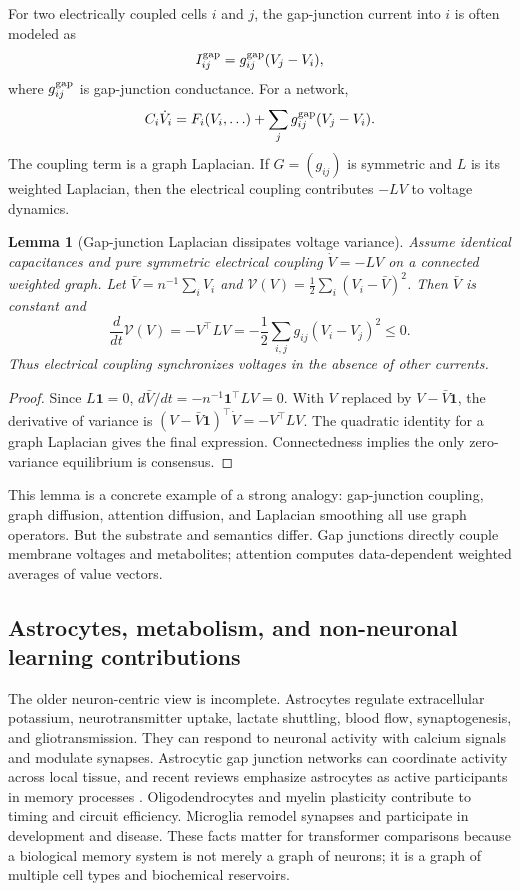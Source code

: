 \documentclass[11pt]{article}
\newtheorem{lemma}[definition]{Lemma}
\newcommand{\1}{\mathbf{1}}
\begin{document}
For two electrically coupled cells $i$ and $j$, the gap-junction current into $i$ is often modeled as
\[
I_{ij}^{\rm gap}=g_{ij}^{\rm gap}(V_j-V_i),
\]
where $g_{ij}^{\rm gap}$ is gap-junction conductance. For a network,
\[
C_i\dot V_i=F_i(V_i,\ldots)+\sum_j g_{ij}^{\rm gap}(V_j-V_i).
\]
The coupling term is a graph Laplacian. If $G=(g_{ij})$ is symmetric and $L$ is its weighted Laplacian, then the electrical coupling contributes $-LV$ to voltage dynamics.

\begin{lemma}[Gap-junction Laplacian dissipates voltage variance]
Assume identical capacitances and pure symmetric electrical coupling $\dot V=-LV$ on a connected weighted graph. Let $\bar V=n^{-1}\sum_i V_i$ and $\mathcal{V}(V)=\frac12\sum_i(V_i-\bar V)^2$. Then $\bar V$ is constant and
\[
\frac{d}{dt}\mathcal{V}(V)=-V^\top L V=-\frac12\sum_{i,j}g_{ij}(V_i-V_j)^2\le0.
\]
Thus electrical coupling synchronizes voltages in the absence of other currents.
\end{lemma}
\begin{proof}
Since $L\1=0$, $d\bar V/dt=-n^{-1}\1^\top LV=0$. With $V$ replaced by $V-\bar V\1$, the derivative of variance is $(V-\bar V\1)^\top\dot V=-V^\top L V$. The quadratic identity for a graph Laplacian gives the final expression. Connectedness implies the only zero-variance equilibrium is consensus.
\end{proof}

This lemma is a concrete example of a strong analogy: gap-junction coupling, graph diffusion, attention diffusion, and Laplacian smoothing all use graph operators. But the substrate and semantics differ. Gap junctions directly couple membrane voltages and metabolites; attention computes data-dependent weighted averages of value vectors.

\subsection{Astrocytes, metabolism, and non-neuronal learning contributions}

The older neuron-centric view is incomplete. Astrocytes regulate extracellular potassium, neurotransmitter uptake, lactate shuttling, blood flow, synaptogenesis, and gliotransmission. They can respond to neuronal activity with calcium signals and modulate synapses. Astrocytic gap junction networks can coordinate activity across local tissue, and recent reviews emphasize astrocytes as active participants in memory processes \cite{Escalada2024,Asher2025,Alberini2025}. Oligodendrocytes and myelin plasticity contribute to timing and circuit efficiency. Microglia remodel synapses and participate in development and disease. These facts matter for transformer comparisons because a biological memory system is not merely a graph of neurons; it is a graph of multiple cell types and biochemical reservoirs.
\end{document}

